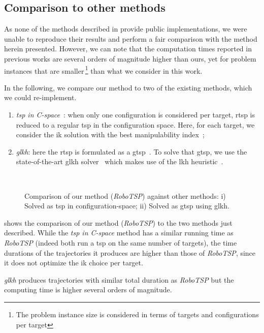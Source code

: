 \subsection{Comparison to other methods}
\label{sub:other_methods}

As none of the methods described in  provide public
implementations, we were unable to reproduce their results and perform a fair
comparison with the method herein presented. However, we can note that the
computation times reported in previous works are several orders of magnitude
higher than ours, yet for problem instances that are smaller\,\footnote{The
problem instance size is considered in terms of targets and configurations per
target} than what we consider in this work.

In the following, we compare our method to two of the existing methods, which we
could re-implement.

\begin{enumerate}

  \item \textit{\acs{tsp} in C-space}~\cite{Edan1991}: when only one
  configuration is considered per target, \ac{rtsp} is reduced to a regular
  \ac{tsp} in the configuration space. Here, for each target, we consider the
  \ac{ik} solution with the best manipulability index~\cite{Yoshikawa1985};

  \item \textit{\acs{glkh}}: here the \ac{rtsp} is formulated as a
  \ac{gtsp}~\cite{Saha2006,Wurll1999,Wurll2001}. To solve that \ac{gtsp}, we use
  the state-of-the-art \acs{glkh} solver~\cite{Helsgaun2015} which makes use of
  the \ac{lkh} heuristic~\cite{Helsgaun2000}.

\end{enumerate}

\begin{figure}[t]
  \centering
  \;
    \\
  \caption{Comparison of our method (\textit{RoboTSP}) against other methods: i)
  Solved as \acs{tsp} in configuration-space; ii) Solved as \acs{gtsp} using
  \acs{glkh}.}
  \label{fig:other_methods}
\end{figure}

 shows the comparison of our method (\textit{RoboTSP})
to the two methods just described. While the \textit{\acs{tsp} in C-space}
method has a similar running time as \textit{RoboTSP} (indeed both run a
\ac{tsp} on the same number of targets), the time durations of the trajectories
it produces are higher than those of \textit{RoboTSP}, since it does not
optimize the \ac{ik} choice per target.

\textit{\acs{glkh}} produces trajectories with similar total duration as
\textit{RoboTSP} but the computing time is higher several orders of magnitude.

